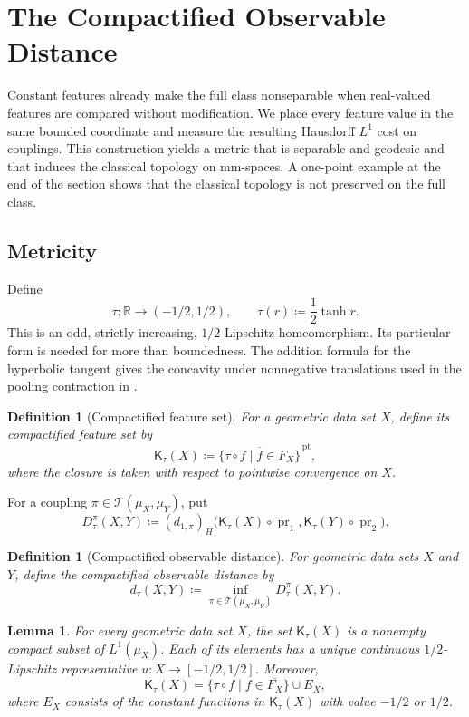 \documentclass[10pt,a4paper]{amsart}
\newtheorem{lemma}[theorem]{Lemma}
\newtheorem{definition}[theorem]{Definition}
\newcommand{\R}{\mathbb R}
\newcommand{\T}{\mathcal T}
\newcommand{\Kc}{\mathsf K}
\newcommand{\dtau}{d_{\tau}}
\DeclareMathOperator{\pr}{pr}
\begin{document}
\section{The Compactified Observable Distance}
\label{sec:bounded-observable-distance}

Constant features already make the full class nonseparable when real-valued features are compared without modification. We place every feature value in the same bounded coordinate and measure the resulting Hausdorff $L^1$ cost on couplings. This construction yields a metric that is separable and geodesic and that induces the classical topology on mm-spaces. A one-point example at the end of the section shows that the classical topology is not preserved on the full class.

\subsection{Metricity}
\label{subsec:dtau-metricity}

Define
\[
\tau\colon\R\longrightarrow(-1/2,1/2),\qquad
\tau(r)\coloneqq\frac12\tanh r.
\]
This is an odd, strictly increasing, $1/2$-Lipschitz homeomorphism. Its particular form is needed for more than boundedness. The addition formula for the hyperbolic tangent gives the concavity under nonnegative translations used in the pooling contraction in .

\begin{definition}[Compactified feature set]
\label{def:compactified-feature-set}
For a geometric data set $X$, define its \emph{compactified feature set} by
\[
\Kc_\tau(X)\coloneqq
\overline{\{\tau\circ f\mid f\in F_X\}}^{\,\mathrm{pt}},
\]
where the closure is taken with respect to pointwise convergence on $X$.
\end{definition}

For a coupling $\pi\in\T(\mu_X,\mu_Y)$, put
\[
D_\tau^\pi(X,Y)\coloneqq(d_{1,\pi})_H
\bigl(\Kc_\tau(X)\circ\pr_1,\Kc_\tau(Y)\circ\pr_2\bigr).
\]

\begin{definition}[Compactified observable distance]
\label{def:dtau}
For geometric data sets $X$ and $Y$, define the \emph{compactified observable distance} by
\[
\dtau(X,Y)\coloneqq\inf_{\pi\in\T(\mu_X,\mu_Y)}D_\tau^\pi(X,Y).
\]
\end{definition}

\begin{lemma}
\label{lem:feature-compactness}
For every geometric data set $X$, the set $\Kc_\tau(X)$ is a nonempty compact subset of $L^1(\mu_X)$. Each of its elements has a unique continuous $1/2$-Lipschitz representative $u\colon X\to[-1/2,1/2]$. Moreover,
\[
\Kc_\tau(X)=\{\tau\circ f\mid f\in\overline{F_X}\}\cup E_X,
\]
where $E_X$ consists of the constant functions in $\Kc_\tau(X)$ with value $-1/2$ or $1/2$.
\end{lemma}
\end{document}
